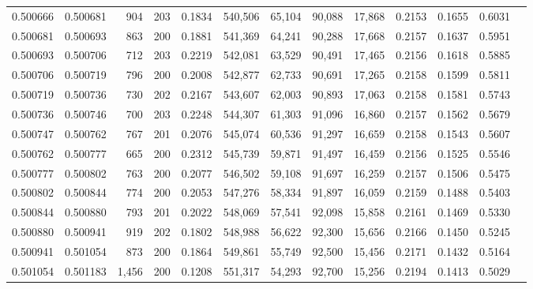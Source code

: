 \begin{tabular}{rrrrrrrrrrrrr}
0.500666 & 0.500681 &   904 & 203 &                                     0.1834 & 540,506 &  65,104 &  90,088 &  17,868 & 0.2153 & 0.1655 & 0.6031 \\
0.500681 & 0.500693 &   863 & 200 &                                     0.1881 & 541,369 &  64,241 &  90,288 &  17,668 & 0.2157 & 0.1637 & 0.5951 \\
0.500693 & 0.500706 &   712 & 203 &                                     0.2219 & 542,081 &  63,529 &  90,491 &  17,465 & 0.2156 & 0.1618 & 0.5885 \\
0.500706 & 0.500719 &   796 & 200 &                                     0.2008 & 542,877 &  62,733 &  90,691 &  17,265 & 0.2158 & 0.1599 & 0.5811 \\
0.500719 & 0.500736 &   730 & 202 &                                     0.2167 & 543,607 &  62,003 &  90,893 &  17,063 & 0.2158 & 0.1581 & 0.5743 \\
0.500736 & 0.500746 &   700 & 203 &                                     0.2248 & 544,307 &  61,303 &  91,096 &  16,860 & 0.2157 & 0.1562 & 0.5679 \\
0.500747 & 0.500762 &   767 & 201 &                                     0.2076 & 545,074 &  60,536 &  91,297 &  16,659 & 0.2158 & 0.1543 & 0.5607 \\
0.500762 & 0.500777 &   665 & 200 &                                     0.2312 & 545,739 &  59,871 &  91,497 &  16,459 & 0.2156 & 0.1525 & 0.5546 \\
0.500777 & 0.500802 &   763 & 200 &                                     0.2077 & 546,502 &  59,108 &  91,697 &  16,259 & 0.2157 & 0.1506 & 0.5475 \\
0.500802 & 0.500844 &   774 & 200 &                                     0.2053 & 547,276 &  58,334 &  91,897 &  16,059 & 0.2159 & 0.1488 & 0.5403 \\
0.500844 & 0.500880 &   793 & 201 &                                     0.2022 & 548,069 &  57,541 &  92,098 &  15,858 & 0.2161 & 0.1469 & 0.5330 \\
0.500880 & 0.500941 &   919 & 202 &                                     0.1802 & 548,988 &  56,622 &  92,300 &  15,656 & 0.2166 & 0.1450 & 0.5245 \\
0.500941 & 0.501054 &   873 & 200 &                                     0.1864 & 549,861 &  55,749 &  92,500 &  15,456 & 0.2171 & 0.1432 & 0.5164 \\
0.501054 & 0.501183 & 1,456 & 200 &                                     0.1208 & 551,317 &  54,293 &  92,700 &  15,256 & 0.2194 & 0.1413 & 0.5029 \\

\end{tabular}
